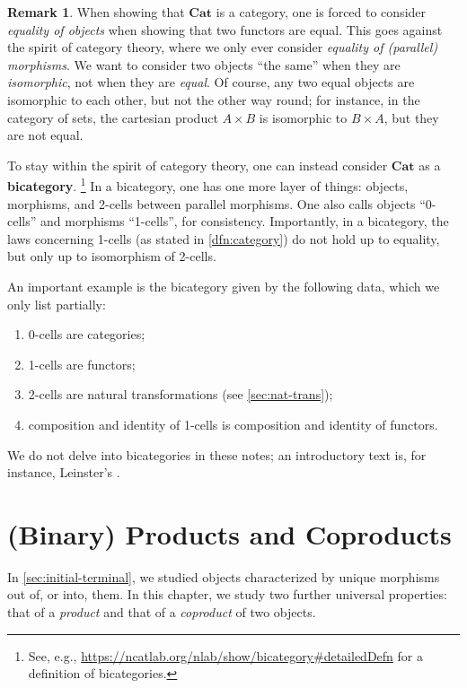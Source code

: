 \documentclass[a4paper,11pt, oneside,titlepage=false]{scrbook}
\theoremstyle{plain}
\theoremstyle{definition}
\newtheorem{rem}[thm]{Remark}
\newcommand{\Catb}[1]{\mathbf{#1}}
\newcommand{\CAT}{\Catb{Cat}}
\begin{document}
\begin{rem}
  When showing that $\CAT$ is a category, one is forced to consider \emph{equality of objects} when showing that two functors are equal.
  This goes against the spirit of category theory, where we only ever consider \emph{equality of (parallel) morphisms}.
  We want to consider two objects ``the same'' when they are \emph{isomorphic}, not when they are \emph{equal}. Of course, any two equal objects are isomorphic to each other, but not the other way round; for instance, in the category of sets, the cartesian product $A \times B$ is isomorphic to $B \times A$, but they are not equal.

  To stay within the spirit of category theory, one can instead consider $\CAT$ as a \textbf{bicategory}.%
  \footnote{See, e.g.,   \url{https://ncatlab.org/nlab/show/bicategory\#detailedDefn} for a definition of bicategories.}
  In a bicategory, one has one more layer of things: objects, morphisms, and 2-cells between parallel morphisms. One also calls objects ``0-cells'' and morphisms ``1-cells'', for consistency.
  Importantly, in a bicategory, the laws concerning 1-cells (as stated in \cref{dfn:category}) do not hold up to equality, but only up to isomorphism of 2-cells.

  An important example is the bicategory given by the following data, which we only list partially:
  \begin{enumerate}
  \item 0-cells are categories;
  \item 1-cells are functors;
  \item 2-cells are natural transformations (see \cref{sec:nat-trans});
  \item composition and identity of 1-cells is composition and identity of functors.
  \end{enumerate}

  We do not delve into bicategories in these notes; an introductory text is, for instance, Leinster's \cite{leinster:basic-bicats}.
\end{rem}


\chapter{(Binary) Products and Coproducts}\label{sec:prod-coprod}

In \cref{sec:initial-terminal}, we studied objects characterized by unique
morphisms out of, or into, them.
In this chapter, we study two further universal properties: that of a
\emph{product} and that of a \emph{coproduct} of two objects.
\end{document}
